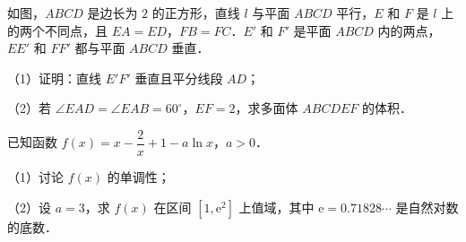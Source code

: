 \begin{question}
如图，$ABCD$ 是边长为 $2$ 的正方形，直线 $l$ 与平面 $ABCD$ 平行，$E$ 和 $F$ 是 $l$ 上的两个不同点，且 $EA=ED$，$FB=FC$．$E'$ 和 $F'$ 是平面 $ABCD$ 内的两点，$EE'$ 和 $FF'$ 都与平面 $ABCD$ 垂直．
\nopagebreak[4]
\begin{center}\end{center}
\nopagebreak[4]
（1）证明：直线 $E'F'$ 垂直且平分线段 $AD$；

（2）若 $\angle EAD=\angle EAB=60^\circ$，$EF=2$，求多面体 $ABCDEF$ 的体积．

\end{question}
\begin{question}
已知函数 $f(x)=x-\dfrac2x+1-a\ln x$，$a>0$．

（1）讨论 $f(x)$ 的单调性；

（2）设 $a=3$，求 $f(x)$ 在区间 $[1,\mathrm e^2]$ 上值域，其中 $\mathrm e=0.71828\cdots$ 是自然对数的底数．

\end{question}